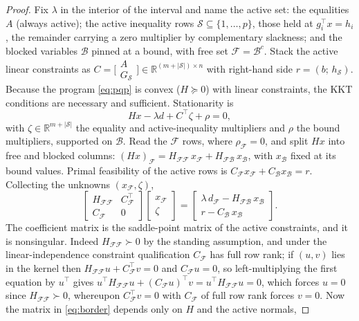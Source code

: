 \documentclass[sts]{imsart}
\newcommand{\R}{\mathbb{R}}
\newcommand{\F}{\mathcal{F}}
\newcommand{\B}{\mathcal{B}}
\newcommand{\Sset}{\mathcal{S}}
\newcommand{\trans}{^{\top}}
\theoremstyle{plain}
\theoremstyle{definition}
\begin{document}
\begin{proof}
Fix $\lambda$ in the interior of the interval and name the active set: the equalities
$A$ (always active); the active inequality rows $\Sset\subseteq\{1,\dots,p\}$, those
held at $g_i\trans x = h_i$, the remainder carrying a zero multiplier by complementary
slackness; and the blocked variables $\B$ pinned at a bound, with free set
$\F=\B^{c}$. Stack the active linear constraints as
$C=\big[\begin{smallmatrix}A\\ G_{\Sset}\end{smallmatrix}\big]\in
\R^{(m+|\Sset|)\times n}$ with right-hand side $r=(b;\,h_{\Sset})$. Because the program
\eqref{eq:pqp} is convex ($H\succeq0$) with linear constraints, the KKT conditions are
necessary and sufficient. Stationarity is
\[
Hx - \lambda d + C\trans\zeta + \rho = 0,
\]
with $\zeta\in\R^{m+|\Sset|}$ the equality and active-inequality multipliers and $\rho$
the bound multipliers, supported on $\B$. Read the $\F$ rows, where $\rho_\F=0$, and
split $Hx$ into free and blocked columns: $(Hx)_\F = H_{\F\F}\,x_\F + H_{\F\B}\,x_\B$,
with $x_\B$ fixed at its bound values. Primal feasibility of the active rows is
$C_\F x_\F + C_\B x_\B = r$. Collecting the unknowns $(x_\F,\zeta)$,
\begin{equation}
\label{eq:border}
\begin{bmatrix} H_{\F\F} & C_\F\trans \\[2pt] C_\F & 0 \end{bmatrix}
\begin{bmatrix} x_\F \\[2pt] \zeta \end{bmatrix}
=
\begin{bmatrix} \lambda\, d_\F - H_{\F\B}\,x_\B \\[2pt] r - C_\B\,x_\B \end{bmatrix}.
\end{equation}
The coefficient matrix is the saddle-point matrix of the active constraints, and it is
nonsingular. Indeed $H_{\F\F}\succ0$ by the standing assumption, and under the
linear-independence constraint qualification $C_\F$ has full
row rank; if $(u,v)$ lies in the kernel then $H_{\F\F}u + C_\F\trans v = 0$ and
$C_\F u = 0$, so left-multiplying the first equation by $u\trans$ gives
$u\trans H_{\F\F}u + (C_\F u)\trans v = u\trans H_{\F\F}u = 0$, which forces $u=0$
since $H_{\F\F}\succ0$, whereupon $C_\F\trans v = 0$ with $C_\F$ of full row rank forces
$v=0$. Now the matrix in \eqref{eq:border} depends only on $H$ and the active normals,

\end{proof}
\end{document}
